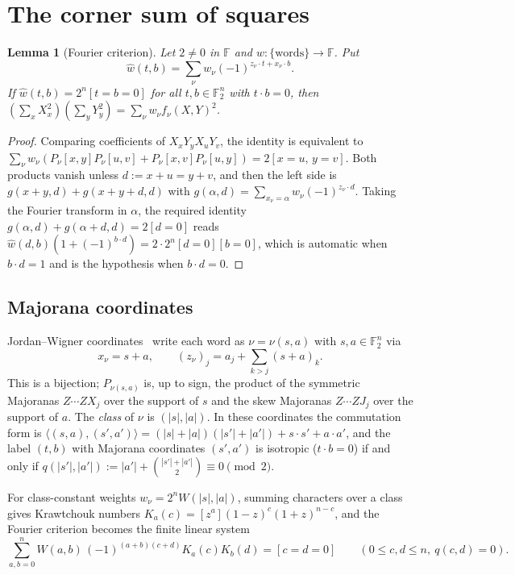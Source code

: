 \documentclass[11pt]{article}
\newtheorem{lemma}[theorem]{Lemma}
\theoremstyle{definition}
\theoremstyle{remark}
\newcommand{\F}{\mathbb{F}}
\begin{document}
\section{The corner sum of squares}\label{sec:corner}

\begin{lemma}[Fourier criterion]\label{lem:fourier}
Let $2\ne0$ in $\F$ and $w:\{\text{words}\}\to\F$. Put
\[\hat w(t,b)=\sum_\nu w_\nu(-1)^{z_\nu\cdot t+x_\nu\cdot b}.\]
If $\hat w(t,b)=2^n[t=b=0]$ for all $t,b\in\F_2^n$ with $t\cdot b=0$, then
$(\sum_xX_x^2)(\sum_yY_y^2)=\sum_\nu w_\nu f_\nu(X,Y)^2$.
\end{lemma}
\begin{proof}
Comparing coefficients of $X_xY_yX_uY_v$, the identity is equivalent to
$\sum_\nu w_\nu(P_\nu[x,y]P_\nu[u,v]+P_\nu[x,v]P_\nu[u,y])=2[x=u,\,y=v]$. Both products vanish unless
$d:=x+u=y+v$, and then the left side is $g(x+y,d)+g(x+y+d,d)$ with
$g(\alpha,d)=\sum_{x_\nu=\alpha}w_\nu(-1)^{z_\nu\cdot d}$. Taking the Fourier transform in $\alpha$, the required
identity $g(\alpha,d)+g(\alpha+d,d)=2[d=0]$ reads $\hat w(d,b)(1+(-1)^{b\cdot d})=2\cdot2^n[d=0][b=0]$, which is
automatic when $b\cdot d=1$ and is the hypothesis when $b\cdot d=0$.
\end{proof}

\subsection{Majorana coordinates}
Jordan--Wigner coordinates~\cite{JordanWigner1928} write each word as $\nu=\nu(s,a)$ with $s,a\in\F_2^n$ via
\[
x_\nu=s+a,\qquad (z_\nu)_j=a_j+\sum_{k>j}(s+a)_k .
\]
This is a bijection; $P_{\nu(s,a)}$ is, up to sign, the product of the symmetric Majoranas $Z\cdots ZX_j$ over the
support of $s$ and the skew Majoranas $Z\cdots ZJ_j$ over the support of $a$. The \emph{class} of $\nu$ is
$(|s|,|a|)$. In these coordinates the commutation form is
$\langle(s,a),(s',a')\rangle=(|s|+|a|)(|s'|+|a'|)+s\cdot s'+a\cdot a'$, and the label $(t,b)$ with Majorana
coordinates $(s',a')$ is isotropic ($t\cdot b=0$) if and only if
$q(|s'|,|a'|):=|a'|+\binom{|s'|+|a'|}{2}\equiv0\pmod 2$.

For class-constant weights $w_\nu=2^nW(|s|,|a|)$, summing characters over a class gives Krawtchouk
numbers $K_a(c)=[z^a](1-z)^c(1+z)^{n-c}$, and the Fourier criterion becomes the finite linear system
\begin{equation}\label{eq:system}
\sum_{a,b=0}^nW(a,b)\,(-1)^{(a+b)(c+d)}K_a(c)K_b(d)=[c=d=0]\qquad(0\le c,d\le n,\ q(c,d)=0).
\end{equation}
\end{document}
